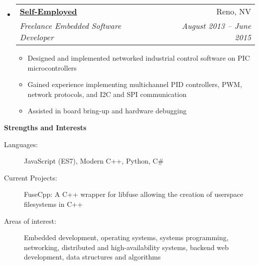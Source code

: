 \documentclass[letterpaper,11pt]{article}
\makeatletter
\newcommand{\resitem}[1]{\item #1 \vspace{-2pt}}
\newcommand{\resheading}[1]{{\normalsize \colorbox{mygrey}{\begin{minipage}{\textwidth}{\textbf{#1 \vphantom{p\^{E}}}}\end{minipage}}}}
\newcommand{\ressubheading}[4]{
\begin{tabular*}{6.5in}{l@{\extracolsep{\fill}}r}
		\textbf{#1} & #2 \\
		\textit{#3} & \textit{#4} \\
\end{tabular*}\vspace{-6pt}}
\makeatother
\begin{document}
\begin{itemize}
		\item
			\ressubheading{\href{https://www.linkedin.com/in/gferneyhough}{Self-Employed}}{Reno, NV}{Freelance Embedded Software Developer}{August 2013 -- June 2015}
				{ \footnotesize
				\begin{itemize}
					\resitem{Designed and implemented networked industrial control software on PIC microcontrollers}
					\resitem{Gained experience implementing multichannel PID controllers, PWM, network protocols, and I2C and SPI communication}
					\resitem{Assisted in board bring-up and hardware debugging}
				\end{itemize}
				}
	\end{itemize}  %

\resheading{Strengths and Interests}
	\linebreak
	\begin{description}
		\item[Languages:] { \footnotesize JavaScript (ES7), Modern C++, Python, C\# }
        \item[Current Projects:] { \footnotesize FuseCpp: A C++ wrapper for libfuse allowing the creation of userspace
        filesystems in C++ }
		\item[Areas of interest:] { \footnotesize Embedded development, operating systems, systems programming, networking, distributed and high-availability systems, backend web development, data structures and algorithms}
	\end{description} %

\end{document}
